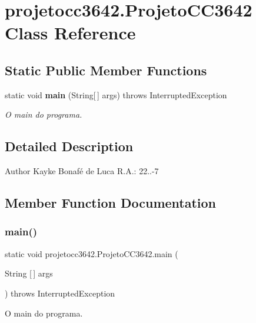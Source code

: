\section{projetocc3642.\+Projeto\+C\+C3642 Class Reference}
\label{classprojetocc3642_1_1_projeto_c_c3642}
\subsection*{Static Public Member Functions}
\begin{DoxyCompactItemize}
\item 
static void \textbf{ main} (String[$\,$] args)  throws Interrupted\+Exception
\begin{DoxyCompactList}\small\item\em O main do programa. \end{DoxyCompactList}\end{DoxyCompactItemize}


\subsection{Detailed Description}
\begin{DoxyAuthor}{Author}
Kayke Bonafé de Luca R.\+A.\+: 22..-\/7 
\end{DoxyAuthor}


\subsection{Member Function Documentation}
\mbox{\label{classprojetocc3642_1_1_projeto_c_c3642_ae9791a0530e6a908cf4e930e109fba86}} 
\subsubsection{main()}
{\footnotesize\ttfamily static void projetocc3642.\+Projeto\+C\+C3642.\+main (\begin{DoxyParamCaption}\item[{String [$\,$]}]{args }\end{DoxyParamCaption}) throws Interrupted\+Exception\hspace{0.3cm}{\ttfamily [static]}}



O main do programa. 


